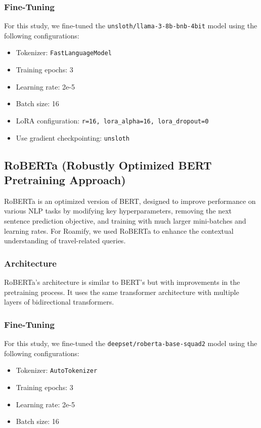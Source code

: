 \documentclass[conference]{IEEEtran}
\begin{document}
\subsubsection{Fine-Tuning}
For this study, we fine-tuned the \texttt{unsloth/llama-3-8b-bnb-4bit} model using the following configurations:
\begin{itemize}
    \item Tokenizer: \texttt{FastLanguageModel}
    \item Training epochs: 3
    \item Learning rate: 2e-5
    \item Batch size: 16
    \item LoRA configuration: \texttt{r=16, lora\_alpha=16, lora\_dropout=0}
    \item Use gradient checkpointing: \texttt{unsloth}
\end{itemize}

\subsection{RoBERTa (Robustly Optimized BERT Pretraining Approach)}

RoBERTa is an optimized version of BERT, designed to improve performance on various NLP tasks by modifying key hyperparameters, removing the next sentence prediction objective, and training with much larger mini-batches and learning rates. For Roamify, we used RoBERTa to enhance the contextual understanding of travel-related queries.

\subsubsection{Architecture}
RoBERTa's architecture is similar to BERT's but with improvements in the pretraining process. It uses the same transformer architecture with multiple layers of bidirectional transformers.

\subsubsection{Fine-Tuning}
For this study, we fine-tuned the \texttt{deepset/roberta-base-squad2} model using the following configurations:
\begin{itemize}
    \item Tokenizer: \texttt{AutoTokenizer}
    \item Training epochs: 3
    \item Learning rate: 2e-5
    \item Batch size: 16
\end{itemize}
\end{document}
